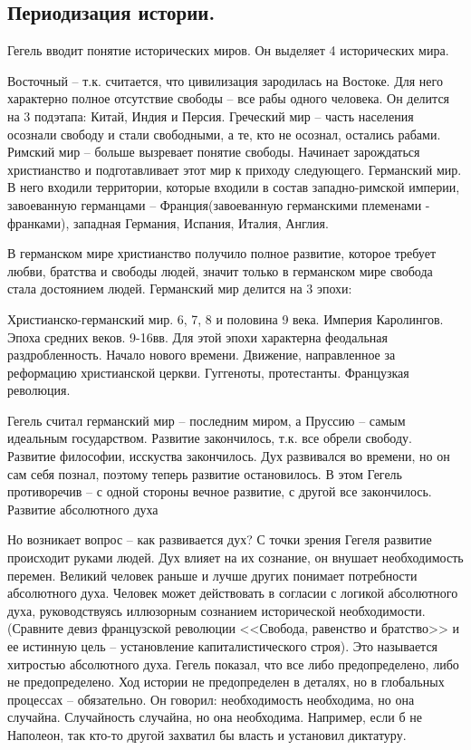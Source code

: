 \subsection{Периодизация истории.}

Гегель вводит понятие исторических миров. Он выделяет 4 исторических мира.

    Восточный – т.к. считается, что цивилизация зародилась на Востоке. Для него характерно полное отсутствие свободы – все рабы одного человека. Он делится на 3 подэтапа: Китай, Индия и Персия.
    Греческий мир – часть населения осознали свободу и стали свободными, а те, кто не осознал, остались рабами.
    Римский мир – больше вызревает понятие свободы. Начинает зарождаться христианство и подготавливает этот мир к приходу следующего.
    Германский мир. В него входили территории, которые входили в состав западно-римской империи, завоеванную германцами – Франция(завоеванную германскими племенами - франками), западная Германия, Испания, Италия, Англия.

В германском мире христианство получило полное развитие, которое требует любви, братства и свободы людей, значит только в германском мире свобода стала достоянием людей. Германский мир делится на 3 эпохи:

    Христианско-германский мир. 6, 7, 8 и половина 9 века. Империя Каролингов.
    Эпоха средних веков. 9-16вв. Для этой эпохи характерна феодальная раздробленность.
    Начало нового времени. Движение, направленное за реформацию христианской церкви. Гуггеноты, протестанты. Французкая революция.

Гегель считал германский мир – последним миром, а Пруссию – самым идеальным государством. Развитие закончилось, т.к. все обрели свободу. Развитие философии, исскуства закончилось. Дух развивался во времени, но он сам себя познал, поэтому теперь развитие остановилось. В этом Гегель противоречив – с одной стороны вечное развитие, с другой все закончилось.
Развитие абсолютного духа

Но возникает вопрос – как развивается дух? С точки зрения Гегеля развитие происходит руками людей. Дух влияет на их сознание, он внушает необходимость перемен. Великий человек раньше и лучше других понимает потребности абсолютного духа. Человек может действовать в согласии с логикой абсолютного духа, руководствуясь иллюзорным сознанием исторической необходимости. (Сравните девиз французской революции <<Свобода, равенство и братство>> и ее истинную цель – установление капиталистического строя). Это называется хитростью абсолютного духа. Гегель показал, что все либо предопределено, либо не предопределено. Ход истории не предопределен в деталях, но в глобальных процессах – обязательно. Он говорил: необходимость необходима, но она случайна. Случайность случайна, но она необходима. Например, если б не Наполеон, так кто-то другой захватил бы власть и установил диктатуру.

